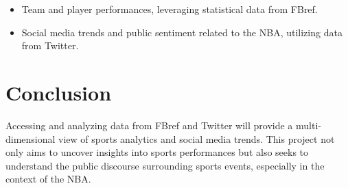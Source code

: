 \documentclass[12pt]{article}
\begin{document}
\begin{itemize}
    \item Team and player performances, leveraging statistical data from FBref.
    \item Social media trends and public sentiment related to the NBA, utilizing data from Twitter.
\end{itemize}

\section{Conclusion}
Accessing and analyzing data from FBref and Twitter will provide a multi-dimensional view of sports analytics and social media trends. This project not only aims to uncover insights into sports performances but also seeks to understand the public discourse surrounding sports events, especially in the context of the NBA.
\end{document}
